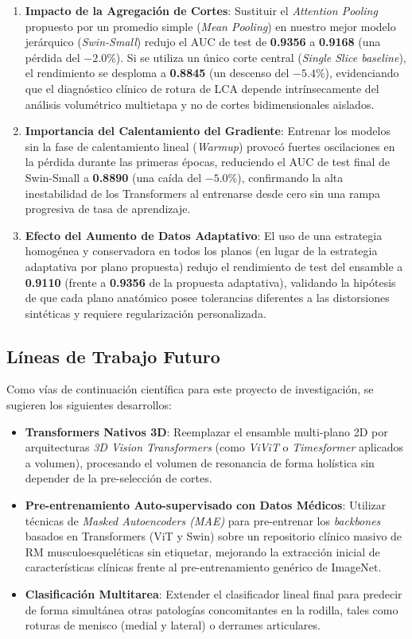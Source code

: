 \begin{enumerate}
    \item \textbf{Impacto de la Agregación de Cortes}: Sustituir el \textit{Attention Pooling} propuesto por un promedio simple (\textit{Mean Pooling}) en nuestro mejor modelo jerárquico (\textit{Swin-Small}) redujo el AUC de test de \textbf{0.9356} a \textbf{0.9168} (una pérdida del $-2.0\%$). Si se utiliza un único corte central (\textit{Single Slice baseline}), el rendimiento se desploma a \textbf{0.8845} (un descenso del $-5.4\%$), evidenciando que el diagnóstico clínico de rotura de LCA depende intrínsecamente del análisis volumétrico multietapa y no de cortes bidimensionales aislados.
    
    \item \textbf{Importancia del Calentamiento del Gradiente}: Entrenar los modelos sin la fase de calentamiento lineal (\textit{Warmup}) provocó fuertes oscilaciones en la pérdida durante las primeras épocas, reduciendo el AUC de test final de Swin-Small a \textbf{0.8890} (una caída del $-5.0\%$), confirmando la alta inestabilidad de los Transformers al entrenarse desde cero sin una rampa progresiva de tasa de aprendizaje.
    
    \item \textbf{Efecto del Aumento de Datos Adaptativo}: El uso de una estrategia homogénea y conservadora en todos los planos (en lugar de la estrategia adaptativa por plano propuesta) redujo el rendimiento de test del ensamble a \textbf{0.9110} (frente a \textbf{0.9356} de la propuesta adaptativa), validando la hipótesis de que cada plano anatómico posee tolerancias diferentes a las distorsiones sintéticas y requiere regularización personalizada.
\end{enumerate}

\subsection{Líneas de Trabajo Futuro}
Como vías de continuación científica para este proyecto de investigación, se sugieren los siguientes desarrollos:
\begin{itemize}
    \item \textbf{Transformers Nativos 3D}: Reemplazar el ensamble multi-plano 2D por arquitecturas \textit{3D Vision Transformers} (como \textit{ViViT} o \textit{Timesformer} aplicados a volumen), procesando el volumen de resonancia de forma holística sin depender de la pre-selección de cortes.
    \item \textbf{Pre-entrenamiento Auto-supervisado con Datos Médicos}: Utilizar técnicas de \textit{Masked Autoencoders (MAE)} para pre-entrenar los \textit{backbones} basados en Transformers (ViT y Swin) sobre un repositorio clínico masivo de RM musculoesqueléticas sin etiquetar, mejorando la extracción inicial de características clínicas frente al pre-entrenamiento genérico de ImageNet.
    \item \textbf{Clasificación Multitarea}: Extender el clasificador lineal final para predecir de forma simultánea otras patologías concomitantes en la rodilla, tales como roturas de menisco (medial y lateral) o derrames articulares.
\end{itemize}
